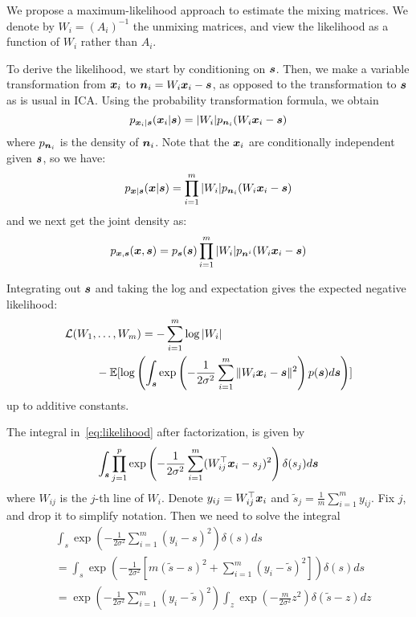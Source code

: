 We propose a maximum-likelihood approach to estimate the mixing matrices. 
We denote by $W_i = (A_i)^{-1}$ the unmixing matrices, and view the likelihood
as a function of $W_i$ rather than $A_i$.

To derive the likelihood, we start by conditioning on $\boldsymbol{s}$. Then, we make a variable transformation from $\boldsymbol{x}_i$ to $\boldsymbol{n}_i=W_i\boldsymbol{x}_i-\boldsymbol{s}$, as opposed to the transformation to $\boldsymbol{s}$ as is usual in ICA. Using the probability transformation formula, we obtain
\begin{equation}
p_{\boldsymbol{x}_i|\boldsymbol{s}}(\boldsymbol{x}_i|\boldsymbol{s})=|W_i|p_{\boldsymbol{n}_i}(W_i\boldsymbol{x}_i-\boldsymbol{s})    
\end{equation}
where $p_{\boldsymbol{n}_i}$ is the density of $\boldsymbol{n}_i$. Note that the $\boldsymbol{x}_i$ are conditionally independent given $\boldsymbol{s}$, so we have:
\begin{equation}
  p_{\boldsymbol{x}|\boldsymbol{s}}(\boldsymbol{x}|\boldsymbol{s})=\prod_{i=1}^m  |W_i| p_{\boldsymbol{n}_i}(W_i\boldsymbol{x}_i-\boldsymbol{s})
\end{equation}
and we next get the joint density as:
\begin{equation}
  p_{\boldsymbol{x}, \boldsymbol{s}}(\boldsymbol{x},\boldsymbol{s})=p_{\boldsymbol{s}}(\boldsymbol{s}) \prod_{i=1}^m  |W_i| p_{\boldsymbol{n}^i}(W_i\boldsymbol{x}_i-\boldsymbol{s})
\end{equation}

Integrating out $\boldsymbol{s}$ and taking the log and expectation gives the expected negative likelihood:
\begin{align} 
  \label{eq:likelihood}
  \mathcal{L}(W_1, &\dots, W_m) = -\sum_{i=1}^m\log|W_i| \nonumber
  \\&  -  \mathbb{E}[\log\left(\int_{\boldsymbol{s}}\exp\left(-\frac1{2\sigma^2}\sum_{i=1}^m\|W_i\boldsymbol{x}_i - \boldsymbol{s}\|^2\right)p(\boldsymbol{s})d\boldsymbol{s}\right)]
\end{align}
up to additive constants.

The integral in~\ref{eq:likelihood} after factorization, is given by
\begin{equation}
\int_{\boldsymbol{s}} \prod_{j=1}^p \exp \left( -\frac{1}{2\sigma^2} \sum_{i=1}^m (W_{ij}^{\top}\boldsymbol{x}_i-s_j)^2 \right) \delta(s_j) d\boldsymbol{s}
\end{equation}
where $W_{ij}$ is the $j$-th line of $W_i$. Denote $y_{ij}=W_{ij}^{\top}\boldsymbol{x}_i$ and $\tilde{s}_j=\frac1m\sum_{i=1}^m y_{ij}$.  Fix $j$, and drop it to simplify notation. Then we need to solve the integral
\begin{align*}
   &\int_s \exp \left(-\frac{1}{2\sigma^2} \sum_{i=1}^m (y_i-s)^2 \right) \delta(s)ds\\
   &=\int_s \exp \left(-\frac{1}{2\sigma^2} [ m(\tilde{s}-s)^2 + \sum_{i=1}^m (y_i-\tilde{s})^2] \right) \delta(s)ds \\ 
&= \exp \left(-\frac{1}{2\sigma^2}\sum_{i=1}^m (y_i-\tilde{s})^2 \right) 
\int_z \exp \left(-\frac{m}{2\sigma^2} z^2 \right) \delta(\tilde{s}-z) dz
\end{align*}

